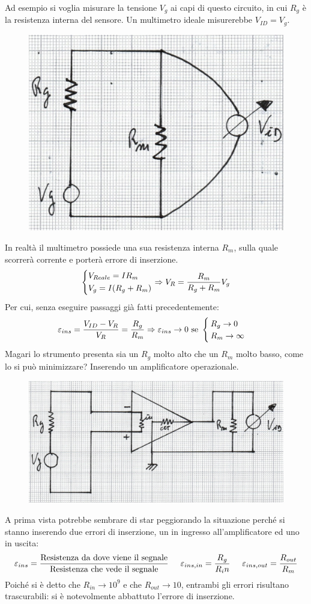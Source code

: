\documentclass[a4paper, 15pt]{article}
\begin{document}
\begin{adjustwidth}{2in}{}
		Ad esempio si voglia misurare la tensione $V_g$ ai capi di questo circuito, in cui $R_g$ è la resistenza interna del sensore. Un multimetro ideale misurerebbe $V_{ID} = V_g$.		
\begin{figure}[H]
	\centering
	\includegraphics[width=0.2\linewidth]{immagini/mm(2)}
	\label{fig:mm2}
\end{figure}		
		In realtà il multimetro possiede una sua resistenza interna $R_m$, sulla quale scorrerà corrente e porterà errore di inserzione. 				
		\[\begin{dcases}
			V_{Reale} = IR_m \\
			V_g = I(R_g + R_m)
   		\end{dcases} \Rightarrow V_R = \dfrac{R_m}{R_g + R_m}V_g \]
   		Per cui, senza eseguire passaggi già fatti precedentemente:
   		\[\varepsilon_{ins} = \dfrac{V_{ID}-V_R}{V_R} = {R_g\over R_m} \Rightarrow \varepsilon_{ins} \rightarrow 0 ~ \text{se} ~ \begin{cases}
   			R_g\rightarrow0\\
   			R_m\rightarrow\infty
   		\end{cases}\]
   		Magari lo strumento presenta sia un $R_g$ molto alto che un $R_m$ molto basso, come lo si può minimizzare? Inserendo un amplificatore operazionale. 
\begin{figure}[H]
	\centering
	\includegraphics[width=0.3\linewidth]{immagini/mm(3)}
	\label{fig:mm3}
\end{figure}
   		A prima vista potrebbe sembrare di star peggiorando la situazione perché si stanno inserendo due errori di inserzione, un in ingresso all'amplificatore ed uno in uscita:   		
   		\[ \varepsilon_{ins} = \frac{\text{Resistenza da dove viene il segnale}}{\text{Resistenza che vede il segnale}} \hspace{0.5cm} \varepsilon_{ins, in} = {R_g\over R_in} \hspace{0.5cm} \varepsilon_{ins, out} = {R_{out}\over R_m}\]
   		Poiché si è detto che $R_{in}\rightarrow10^9$ e che $R_{out}\rightarrow10$, entrambi gli errori risultano trascurabili: si è notevolmente abbattuto l'errore di inserzione. \newline 
   		

\end{adjustwidth}
\end{document}
